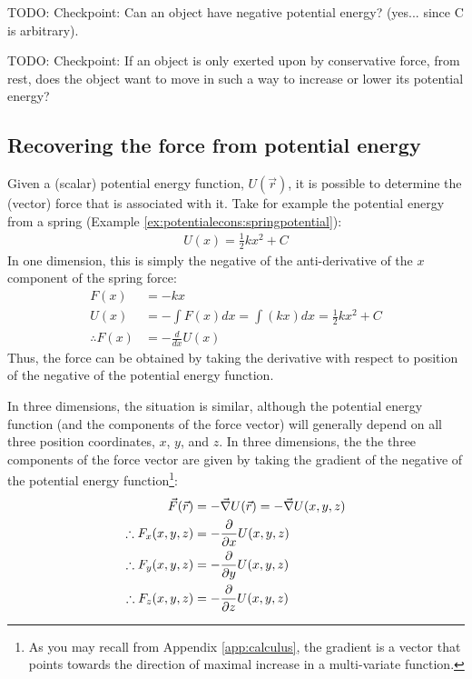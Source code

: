 TODO: Checkpoint: Can an object have negative potential energy? (yes... since C is arbitrary).

TODO: Checkpoint: If an object is only exerted upon by conservative force, from rest, does the object want to move in such a way to increase or lower its potential energy?

\subsection{Recovering the force from potential energy}
Given a (scalar) potential energy function, $U(\vec r)$, it is possible to determine the (vector) force that is associated with it. Take for example the potential energy from a spring (Example \ref{ex:potentialecons:springpotential}):
\begin{align*}
U(x) = \frac{1}{2}kx^2 + C
\end{align*} 
In one dimension, this is simply the negative of the anti-derivative of the $x$ component of the spring force:
\begin{align*}
F(x) &= -kx\\
U(x) &= -\int F(x) dx = \int (kx) dx = \frac{1}{2}kx^2+C\\
\therefore F(x) &= -\frac{d}{dx}U(x)
\end{align*}
Thus, the force can be obtained by taking the derivative with respect to position of the negative of the potential energy function. 

In three dimensions, the situation is similar, although the potential energy function (and the components of the force vector) will generally depend on all three position coordinates, $x$, $y$, and $z$. In three dimensions, the the three components of the force vector are given by taking the gradient of the negative of the potential energy function\footnote{As you may recall from Appendix \ref{app:calculus}, the gradient is a vector that points towards the direction of maximal increase in a multi-variate function.}:
\begin{align}
\vec F(\vec r) &= -\vec\nabla U(\vec r)=-\vec\nabla U(x,y,z)\nonumber\\
\therefore F_x(x,y,z) &= -\frac{\partial }{\partial x}U(x,y,z)\nonumber\\
\therefore F_y(x,y,z) &= -\frac{\partial }{\partial y}U(x,y,z)\nonumber\\
\therefore F_z(x,y,z) &= -\frac{\partial }{\partial z}U(x,y,z)
\end{align}

